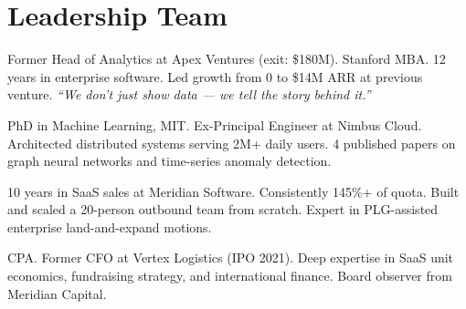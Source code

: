 \documentclass[11pt,a4paper]{article}
\newcommand{\sectionicon}[1]{\textcolor{NexaTeal}{#1}\hspace{4pt}}
\begin{document}
\section{\sectionicon{\faUsers}Leadership Team}

\noindent
\begin{minipage}[t]{0.48\linewidth}
  \begin{tcolorbox}[nexacard, title={\faUser\enspace Clara Whitmore --- CEO \& Co-Founder}]
    \small
    Former Head of Analytics at Apex Ventures (exit: \$180M). Stanford MBA. 12 years
    in enterprise software. Led growth from 0 to \$14M ARR at previous venture.
    \textit{``We don't just show data --- we tell the story behind it.''}
  \end{tcolorbox}
\end{minipage}\hfill
\begin{minipage}[t]{0.48\linewidth}
  \begin{tcolorbox}[nexacard, title={\faUser\enspace Daniel Osei --- CTO \& Co-Founder}]
    \small
    PhD in Machine Learning, MIT. Ex-Principal Engineer at Nimbus Cloud. Architected
    distributed systems serving 2M+ daily users. 4 published papers on graph neural
    networks and time-series anomaly detection.
  \end{tcolorbox}
\end{minipage}

\par\vspace{4pt}

\noindent
\begin{minipage}[t]{0.48\linewidth}
  \begin{tcolorbox}[nexacard, title={\faUser\enspace Sofia Nakamura --- VP Sales}]
    \small
    10 years in SaaS sales at Meridian Software. Consistently 145\%+ of quota.
    Built and scaled a 20-person outbound team from scratch. Expert in PLG-assisted
    enterprise land-and-expand motions.
  \end{tcolorbox}
\end{minipage}\hfill
\begin{minipage}[t]{0.48\linewidth}
  \begin{tcolorbox}[nexacard, title={\faUser\enspace James Okonkwo --- CFO (Advisor)}]
    \small
    CPA. Former CFO at Vertex Logistics (IPO 2021). Deep expertise in SaaS unit
    economics, fundraising strategy, and international finance. Board observer
    from Meridian Capital.
  \end{tcolorbox}
\end{minipage}
\end{document}
